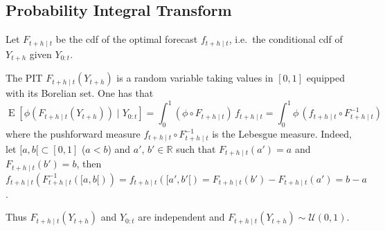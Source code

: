 \documentclass{article}
\DeclareMathOperator{\E}{E}
\begin{document}
\subsection{Probability Integral Transform}
\label{sec:PIT}

Let $F_{t+h \mid t}$ be the cdf of the optimal forecast $f_{t+h \mid t}$, i.e.\ the conditional cdf of $Y_{t+h}$ given $Y_{0:t}$.

The PIT $F_{t+h \mid t}(Y_{t+h})$ is a random variable taking values in $[0,1]$ equipped with its Borelian set. One has that
\begin{equation*}
    \E[\phi(F_{t+h \mid t}(Y_{t+h})) \mid Y_{0:t}] = \int_0^1 (\phi \circ F_{t+h \mid t}) \, f_{t+h \mid t} = \int_0^1 \phi \, (f_{t+h \mid t} \circ F_{t+h \mid t}^{-1})    
\end{equation*}
where the pushforward measure $f_{t+h \mid t} \circ F_{t+h \mid t}^{-1}$ is the Lebesgue measure. Indeed, let $[a,b[ \subset [0,1]$ ($a<b$) and $a'$, $b' \in \mathbb R$ such that $F_{t+h \mid t}(a')=a$ and $F_{t+h \mid t}(b')=b$, then $f_{t+h \mid t}(F_{t+h \mid t}^{-1}([a,b[)) = f_{t+h \mid t}([a',b'[)=F_{t+h \mid t}(b') - F_{t+h \mid t}(a')=b-a$.

Thus $F_{t+h \mid t}(Y_{t+h})$ and $Y_{0:t}$ are independent and $F_{t+h \mid t}(Y_{t+h}) \sim \mathcal U(0,1)$.
\end{document}
